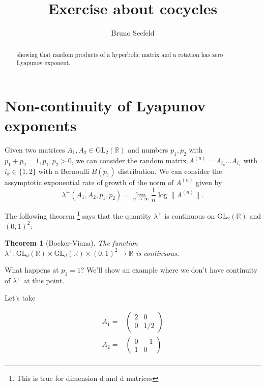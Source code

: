 \documentclass{article}
\title{Exercise about cocycles}
\author{Bruno Seefeld}
\newtheorem{theorem}{Theorem}[section]
\begin{document}
\maketitle


\begin{abstract}
showing that random products of a hyperbolic matrix and a rotation
has zero Lyapunov exponent.
\end{abstract}



\section{Non-continuity of Lyapunov exponents}

Given two matrices $A_1,A_2\in \text{GL}_2(\mathbb{R})$ and 
numbers $p_1,p_2$ with $p_1+p_2=1,p_1,p_2>0$, we can consider
the random matrix $A^(n)=A_{i_n}\ldots A_{i_1}$ with $i_k\in\{1,2\}$
with a Bernoulli $B(p_1)$ distribution. We can consider the assymptotic
exponential rate of growth of the  norm of $A^{(n)}$ given by 
\begin{equation}
\lambda^+(A_1,A_2,p_1,p_2)=\lim_{n\to \infty}\frac{1}{n}\log \|A^{(n)}\|.
\end{equation}

The following theorem \footnote{This is true for dimension d and d matrices} says that the quantity $\lambda^+$ is continuous
on $\text{GL}_2(\mathbb{R})$ and $(0,1)^2$:

\begin{theorem}[Bocker-Viana]
    The function $\lambda^+: \text{GL}_d(\mathbb{R})\times \text{GL}_d(\mathbb{R}) \times (0,1)^2\to \mathbb{R} $
    is continuous. 
\end{theorem}


What happens at $p_1=1$? We'll show an example where we don't have continuity
of $\lambda^+$ at this point. 

Let's take

\begin{align*}
    A_1=&
    \begin{pmatrix}
        2 & 0 \\
        0 & 1/2
    \end{pmatrix}\\
    A_2=&
    \begin{pmatrix}
        0 & -1 \\
        1 & 0
    \end{pmatrix}\\
\end{align*}
\end{document}
